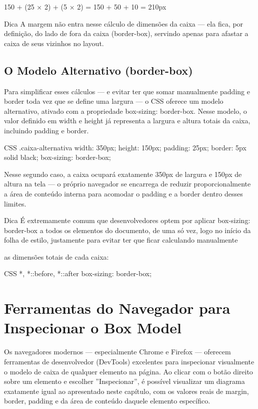 150 + (25 × 2) + (5 × 2) = 150 + 50 + 10 = 210px

\begin{infobox}{Dica}
A margem não entra nesse cálculo de dimensões da caixa — ela fica, por definição, do lado de fora da caixa (border-box), servindo apenas para afastar a caixa de seus vizinhos no layout.
\end{infobox}

\subsection{O Modelo Alternativo (border-box)}

Para simplificar esses cálculos — e evitar ter que somar manualmente padding e border toda vez que se define uma largura — o CSS oferece um modelo alternativo, ativado com a propriedade box-sizing: border-box. Nesse modelo, o valor definido em width e height já representa a largura e altura totais da caixa, incluindo padding e border.

\begin{codebox}{CSS}
.caixa-alternativa {
  width: 350px;
  height: 150px;
  padding: 25px;
  border: 5px solid black;
  box-sizing: border-box;
}
\end{codebox}

Nesse segundo caso, a caixa ocupará exatamente 350px de largura e 150px de altura na tela — o próprio navegador se encarrega de reduzir proporcionalmente a área de conteúdo interna para acomodar o padding e a border dentro desses limites.

\begin{infobox}{Dica}
É extremamente comum que desenvolvedores optem por aplicar box-sizing: border-box a todos os elementos do documento, de uma só vez, logo no início da folha de estilo, justamente para evitar ter que ficar calculando manualmente
\end{infobox}

as dimensões totais de cada caixa:

\begin{codebox}{CSS}
*, *::before, *::after {
  box-sizing: border-box;
}
\end{codebox}

\section{Ferramentas do Navegador para Inspecionar o Box Model}

Os navegadores modernos — especialmente Chrome e Firefox — oferecem ferramentas de desenvolvedor (DevTools) excelentes para inspecionar visualmente o modelo de caixa de qualquer elemento na página. Ao clicar com o botão direito sobre um elemento e escolher ”Inspecionar”, é possível visualizar um diagrama exatamente igual ao apresentado neste capítulo, com os valores reais de margin, border, padding e da área de conteúdo daquele elemento específico.

